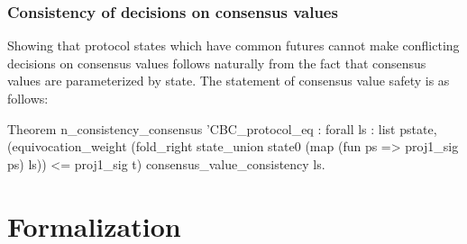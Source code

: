 \documentclass[runningheads]{llncs}
\begin{document}
\subsubsection{Consistency of decisions on consensus values} 
Showing that protocol states which have common futures cannot make conflicting decisions on consensus values follows naturally from the fact that consensus values are parameterized by state. The statement of consensus value safety is as follows: 
\begin{coq}
Theorem n_consistency_consensus '{CBC_protocol_eq} :
	forall ls : list pstate,
	(equivocation_weight (fold_right state_union state0 
	(map (fun ps => proj1_sig ps) ls)) <= proj1_sig t)%
	consensus_value_consistency ls. 
\end{coq}

\section{Formalization}
\end{document}
